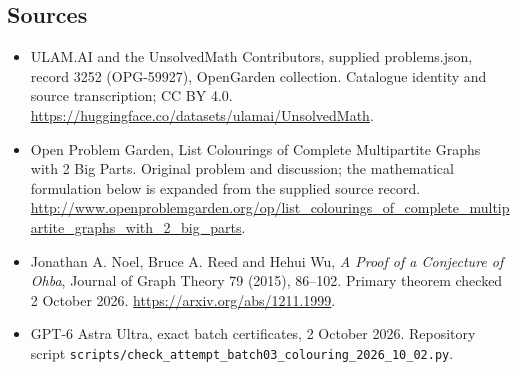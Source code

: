\documentclass[11pt,a4paper]{article}
\begin{document}
\subsection{Sources}
\begin{itemize}
\item[S1] ULAM.AI and the UnsolvedMath Contributors, supplied problems.json, record 3252 (OPG-59927), OpenGarden collection. Catalogue identity and source transcription; CC BY 4.0.
\url{https://huggingface.co/datasets/ulamai/UnsolvedMath}.
\item[S2] Open Problem Garden, List Colourings of Complete Multipartite Graphs with 2 Big Parts. Original problem and discussion; the mathematical formulation below is expanded from the supplied source record.
\url{http://www.openproblemgarden.org/op/list_colourings_of_complete_multipartite_graphs_with_2_big_parts}.

\item[R1] Jonathan A. Noel, Bruce A. Reed and Hehui Wu,
\emph{A Proof of a Conjecture of Ohba}, Journal of Graph Theory
79 (2015), 86--102. Primary theorem checked 2 October 2026.
\url{https://arxiv.org/abs/1211.1999}.
\item[R2] GPT-6 Astra Ultra, exact batch certificates, 2 October 2026.
Repository script \texttt{scripts/check\_attempt\_batch03\_colouring\_2026\_10\_02.py}.

\end{itemize}
\end{document}
